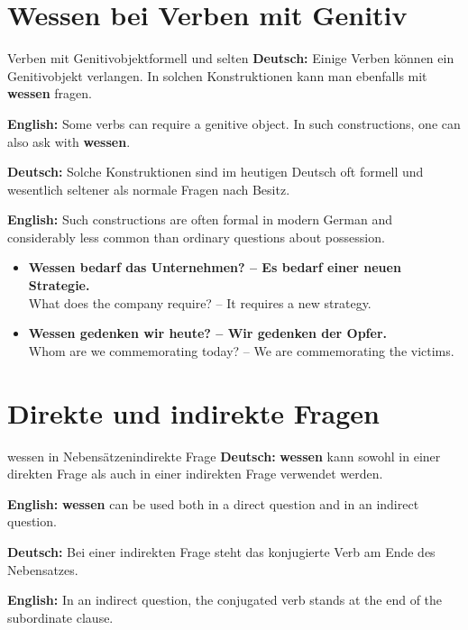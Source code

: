 \documentclass[a4paper,11pt]{article}
\newcommand{\GermanText}[1]{\textbf{Deutsch: }#1\par}
\newcommand{\EnglishText}[1]{{\small\color{SoftGray}\textbf{English: }#1\par}}
\newcommand{\ExampleItem}[2]{\item \textbf{#1}\\{\small\color{SoftGray}#2}}
\begin{document}
    
    \section{Wessen bei Verben mit Genitiv}
        
        \begin{grammarentry}{Verben mit Genitivobjekt}{formell und selten}
            \GermanText{Einige Verben können ein Genitivobjekt verlangen. In solchen Konstruktionen kann man ebenfalls mit \textbf{wessen} fragen.}
            \EnglishText{Some verbs can require a genitive object. In such constructions, one can also ask with \textbf{wessen}.}
            
            \GermanText{Solche Konstruktionen sind im heutigen Deutsch oft formell und wesentlich seltener als normale Fragen nach Besitz.}
            \EnglishText{Such constructions are often formal in modern German and considerably less common than ordinary questions about possession.}
        \end{grammarentry}
        
        \begin{exbox}
            \begin{itemize}
                \ExampleItem{Wessen bedarf das Unternehmen? -- Es bedarf einer neuen Strategie.}{What does the company require? -- It requires a new strategy.}
                
                \ExampleItem{Wessen gedenken wir heute? -- Wir gedenken der Opfer.}{Whom are we commemorating today? -- We are commemorating the victims.}
            \end{itemize}
        \end{exbox}
    
    
    \section{Direkte und indirekte Fragen}
        
        \begin{grammarentry}{wessen in Nebensätzen}{indirekte Frage}
            \GermanText{\textbf{wessen} kann sowohl in einer direkten Frage als auch in einer indirekten Frage verwendet werden.}
            \EnglishText{\textbf{wessen} can be used both in a direct question and in an indirect question.}
            
            \GermanText{Bei einer indirekten Frage steht das konjugierte Verb am Ende des Nebensatzes.}
            \EnglishText{In an indirect question, the conjugated verb stands at the end of the subordinate clause.}
        \end{grammarentry}
        
\end{document}
